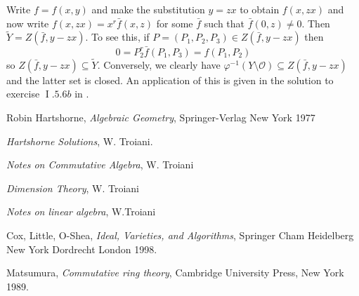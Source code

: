 \documentclass[12pt]{article}
\theoremstyle{plain}
\theoremstyle{definition}
\newcommand{\call}[1]{\mathcal{#1}}
\begin{document}
Write $f = f(x,y)$ and make the substitution $y = zx$ to obtain $f(x,zx)$ and now write $f(x,zx) = x^r\bar{f}(x,z)$ for some $\bar{f}$ such that $\bar{f}(0,z) \neq 0$. Then $\tilde{Y} = Z(\bar{f},y - zx)$. To see this, if $P = (P_1,P_2,P_3) \in Z(\bar{f},y - zx)$ then 
\[0= P_2^r\bar{f}(P_1,P_3) = f(P_1,P_2)\]
so $Z(\bar{f},y - zx) \subseteq \tilde{Y}$. Conversely, we clearly have $\varphi^{-1}(Y\setminus\call{O}) \subseteq Z(\bar{f},y - zx)$
 and the latter set is closed. An application of this is given in the solution to exercise $\operatorname{I}.5.6b$ in \cite{hartshorne_solutions}.























\begin{thebibliography}{9}
 Robin Hartshorne, \emph{Algebraic Geometry}, Springer-Verlag New York 1977

 \emph{Hartshorne Solutions}, W. Troiani.

 \emph{Notes on Commutative Algebra}, W. Troiani

 \emph{Dimension Theory}, W. Troiani

 \emph{Notes on linear algebra}, W.Troiani

 Cox, Little, O-Shea, \emph{Ideal, Varieties, and Algorithms}, Springer Cham Heidelberg New York Dordrecht London 1998.

 Matsumura, \emph{Commutative ring theory}, Cambridge University Press, New York 1989.

\end{thebibliography}
\end{document}
